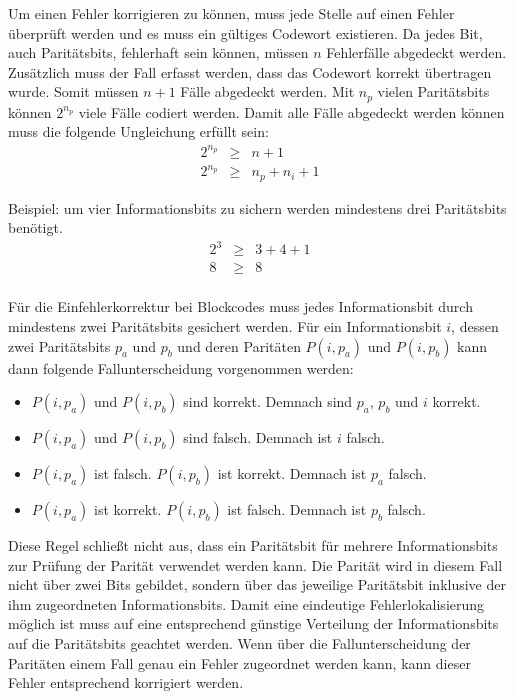 Um einen Fehler korrigieren zu können, muss jede Stelle auf einen Fehler überprüft werden und es muss ein gültiges Codewort existieren. Da jedes Bit, auch Paritätsbits, fehlerhaft sein können, müssen $n$ Fehlerfälle abgedeckt werden. Zusätzlich muss der Fall erfasst werden, dass das Codewort korrekt übertragen wurde. Somit müssen $n+1$ Fälle abgedeckt werden. Mit $n_p$ vielen Paritätsbits können $2^{n_p}$ viele Fälle codiert werden. Damit alle Fälle abgedeckt werden können muss die folgende Ungleichung erfüllt sein:
\begin{eqnarray*}
2^{n_p} &\ge& n + 1 \\
2^{n_p} &\ge& n_p + n_i + 1
\end{eqnarray*}

Beispiel: um vier Informationsbits zu sichern werden mindestens drei Paritätsbits benötigt.
\begin{eqnarray*}
2^{3} &\ge& 3 + 4 + 1 \\
8 &\ge& 8 \\
\end{eqnarray*}

Für die Einfehlerkorrektur bei Blockcodes muss jedes Informationsbit durch mindestens zwei Paritätsbits gesichert werden. Für ein Informationsbit $i$, dessen zwei Paritätsbits $p_a$ und $p_b$ und deren Paritäten $P(i, p_a)$ und $P(i, p_b)$ kann dann folgende Fallunterscheidung vorgenommen werden:
\begin{itemize}
\item
	$P(i, p_a)$ und $P(i, p_b)$ sind korrekt. Demnach sind $p_a$, $p_b$ und $i$ korrekt.
\item
	$P(i, p_a)$ und $P(i, p_b)$ sind falsch. Demnach ist $i$ falsch.
\item
	$P(i, p_a)$ ist falsch. $P(i, p_b)$ ist korrekt. Demnach ist $p_a$ falsch.
\item
	$P(i, p_a)$ ist korrekt. $P(i, p_b)$ ist falsch. Demnach ist $p_b$ falsch.
\end{itemize}
Diese Regel schließt nicht aus, dass ein Paritätsbit für mehrere Informationsbits zur Prüfung der Parität verwendet werden kann. Die Parität wird in diesem Fall nicht über zwei Bits gebildet, sondern über das jeweilige Paritätsbit inklusive der ihm zugeordneten Informationsbits. Damit eine eindeutige Fehlerlokalisierung möglich ist muss auf eine entsprechend günstige Verteilung der Informationsbits auf die Paritätsbits geachtet werden. Wenn über die Fallunterscheidung der Paritäten einem Fall genau ein Fehler zugeordnet werden kann, kann dieser Fehler entsprechend korrigiert werden.

